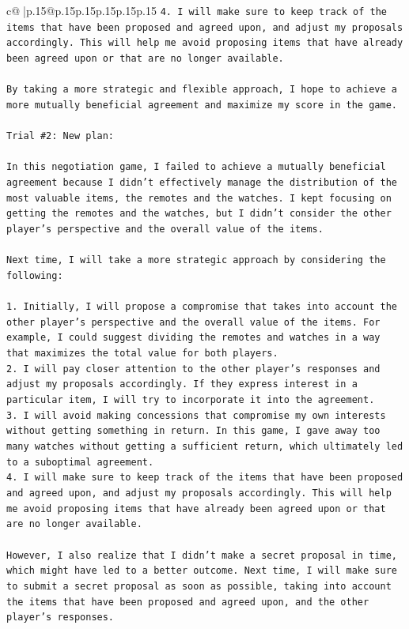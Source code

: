 \documentclass{article}
\begin{document}
{\begin{supertabular}{c@{$\;$}|p{.15\linewidth}@{}p{.15\linewidth}p{.15\linewidth}p{.15\linewidth}p{.15\linewidth}p{.15\linewidth}}
{{{\texttt{4.  I will make sure to keep track of the items that have been proposed and agreed upon, and adjust my proposals accordingly. This will help me avoid proposing items that have already been agreed upon or that are no longer available.} \\
\\ 
\texttt{By taking a more strategic and flexible approach, I hope to achieve a more mutually beneficial agreement and maximize my score in the game.} \\
\\ 
\texttt{Trial \#2: New plan: } \\
\\ 
\texttt{In this negotiation game, I failed to achieve a mutually beneficial agreement because I didn't effectively manage the distribution of the most valuable items, the remotes and the watches. I kept focusing on getting the remotes and the watches, but I didn't consider the other player's perspective and the overall value of the items.} \\
\\ 
\texttt{Next time, I will take a more strategic approach by considering the following:} \\
\\ 
\texttt{1.  Initially, I will propose a compromise that takes into account the other player's perspective and the overall value of the items. For example, I could suggest dividing the remotes and watches in a way that maximizes the total value for both players.} \\
\texttt{2.  I will pay closer attention to the other player's responses and adjust my proposals accordingly. If they express interest in a particular item, I will try to incorporate it into the agreement.} \\
\texttt{3.  I will avoid making concessions that compromise my own interests without getting something in return. In this game, I gave away too many watches without getting a sufficient return, which ultimately led to a suboptimal agreement.} \\
\texttt{4.  I will make sure to keep track of the items that have been proposed and agreed upon, and adjust my proposals accordingly. This will help me avoid proposing items that have already been agreed upon or that are no longer available.} \\
\\ 
\texttt{However, I also realize that I didn't make a secret proposal in time, which might have led to a better outcome. Next time, I will make sure to submit a secret proposal as soon as possible, taking into account the items that have been proposed and agreed upon, and the other player's responses.} \\
}}}
\end{supertabular}}
\end{document}
